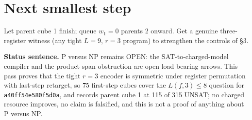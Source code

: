 \documentclass[11pt]{article}
\begin{document}
\section*{Next smallest step}
Let parent cube 1 finish; queue $w_1=0$ parents 2 onward. Get a genuine three-register witness (any tight $L=9$, $r=3$ program) to strengthen the controls of \S3.

\bigskip
\noindent\textbf{Status sentence.} P versus NP remains OPEN: the SAT-to-charged-model compiler and the product-span obstruction are open load-bearing arrows. This pass proves that the tight $r=3$ encoder is symmetric under register permutation with last-step retarget, so 75 first-step cubes cover the $L(f,3)\le 8$ question for \texttt{a40ff54e580f5d0a}, and records parent cube 1 at 115 of 315 UNSAT; no charged resource improves, no claim is falsified, and this is not a proof of anything about P versus NP.
\end{document}
